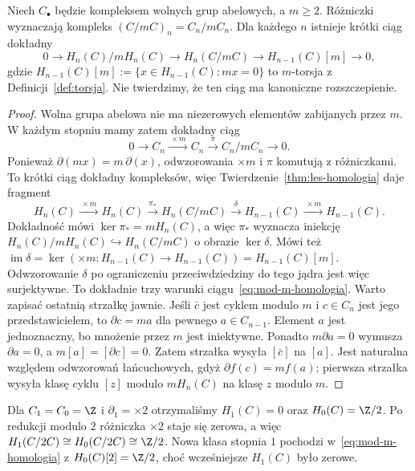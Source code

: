 \begin{twierdzenie}
\label{thm:mod-m-homologia}
Niech $C_\bullet$ będzie kompleksem
wolnych grup abelowych, a $m\geq2$.
Różniczki wyznaczają kompleks
$(C/mC)_n=C_n/mC_n$. Dla każdego
$n$ istnieje krótki ciąg dokładny
\begin{equation}\label{eq:mod-m-homologia}
 0\longrightarrow H_n(C)/mH_n(C)
 \longrightarrow H_n(C/mC)
 \longrightarrow H_{n-1}(C)[m]
 \longrightarrow0,
\end{equation}
gdzie $H_{n-1}(C)[m]:=
\{x\in H_{n-1}(C):mx=0\}$
to $m$-torsja z Definicji~\ref{def:torsja}.
Nie twierdzimy, że ten ciąg ma
kanoniczne rozszczepienie.
\end{twierdzenie}
\begin{proof}
Wolna grupa abelowa nie ma
niezerowych elementów zabijanych
przez $m$. W każdym stopniu mamy
zatem dokładny ciąg
\[
 0\to C_n\xrightarrow{\ \times m\ }C_n
 \xrightarrow{\ \pi\ }C_n/mC_n\to0.
\]
Ponieważ $\partial(mx)=m\,\partial(x)$,
odwzorowania $\times m$ i $\pi$
komutują z różniczkami.
To krótki ciąg dokładny
kompleksów, więc
Twierdzenie~\ref{thm:les-homologia}
daje fragment
\[
 H_n(C)\xrightarrow{\ \times m\ }H_n(C)
 \xrightarrow{\ \pi_*\ }H_n(C/mC)
 \xrightarrow{\ \delta\ }H_{n-1}(C)
 \xrightarrow{\ \times m\ }H_{n-1}(C).
\]
Dokładność mówi
$\ker\pi_*=mH_n(C)$, a więc
$\pi_*$ wyznacza iniekcję
$H_n(C)/mH_n(C)\hookrightarrow H_n(C/mC)$
o obrazie $\ker\delta$.
Mówi też
$\operatorname{im}\delta
=\ker(\times m:H_{n-1}(C)\to H_{n-1}(C))
=H_{n-1}(C)[m]$.
Odwzorowanie $\delta$ po ograniczeniu
przeciwdziedziny do tego jądra
jest więc surjektywne.
To dokładnie trzy warunki
ciągu~\eqref{eq:mod-m-homologia}.
Warto zapisać ostatnią strzałkę jawnie. Jeśli $\bar c$ jest cyklem
modulo $m$ i $c\in C_n$ jest jego przedstawicielem, to
$\partial c=ma$ dla pewnego $a\in C_{n-1}$.
Element $a$ jest jednoznaczny, bo mnożenie przez $m$ jest iniektywne.
Ponadto $m\partial a=0$ wymusza $\partial a=0$,
a $m[a]=[\partial c]=0$. Zatem strzałka wysyła $[\bar c]$ na $[a]$.
Jest naturalna względem odwzorowań łańcuchowych, gdyż
$\partial f(c)=mf(a)$; pierwsza strzałka wysyła klasę cyklu
$[z]$ modulo $mH_n(C)$ na klasę $z$ modulo $m$.
\end{proof}

\begin{przyklad}
Dla $C_1=C_0=\Z$ i $\partial_1=\times2$
otrzymaliśmy $H_1(C)=0$ oraz
$H_0(C)=\Z/2$. Po redukcji modulo
$2$ różniczka $\times2$ staje się
zerowa, a więc
$H_1(C/2C)\cong H_0(C/2C)\cong\Z/2$.
Nowa klasa stopnia $1$ pochodzi
w~\eqref{eq:mod-m-homologia} z
$H_0(C)[2]=\Z/2$, choć wcześniejsze
$H_1(C)$ było zerowe.
\end{przyklad}

